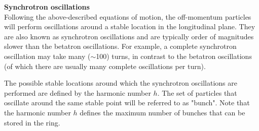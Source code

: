 

\textbf{Synchrotron oscillations}\\
Following the above-described equations of motion, the off-momentum particles will perform oscillations around a stable location in the longitudinal plane.  They are also known as synchrotron oscillations and are typically order of magnitudes slower than the betatron oscillations. For example, a complete synchrotron oscillation may take many ($\sim$100) turns, in contrast to the betatron oscillations (of which there are usually many complete oscillations per turn).

The possible stable locations around which the synchrotron oscillations are performed are defined by the harmonic number $h$. The set of particles that oscillate around the same stable point will be referred to as "bunch". Note that the harmonic number $h$ defines the maximum number of bunches that can be stored in the ring.



